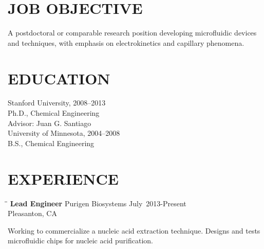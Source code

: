 \documentclass{res}
\begin{document}

\address{\bf  Address\\40049 Fremont Blvd.\\Apt. 710\\Fremont, CA 94538\\(650) 391-8463}

\address{\bf  Citizenship\\United States \\ \\ \bf E-Mail \\ lewis.a.marshall@gmail.com}

\begin{resume}

\section{JOB OBJECTIVE}
    A postdoctoral or comparable research position developing microfluidic devices and techniques, with emphasis on electrokinetics and capillary phenomena.

\section{EDUCATION}
		Stanford University, 2008--2013 \\
  		Ph.D., Chemical Engineering\\
  		Advisor: Juan G. Santiago\\

		University of Minnesota, 2004--2008 \\
  		B.S., Chemical Engineering\\


\section{EXPERIENCE}
   \vspace{-0.1in}

   \begin{tabbing}
   \hspace{2.1in}\= \hspace{2.9in}\= \kill %
    {\bf Lead Engineer} \>Purigen Biosystems  \>July~2013-Present\\
                             \>Pleasanton, CA
   \end{tabbing}\vspace{-20pt}      %
    Working to commercialize a nucleic acid extraction technique. Designs and tests microfluidic chips for nucleic acid purification.


\end{resume}
\end{document}
